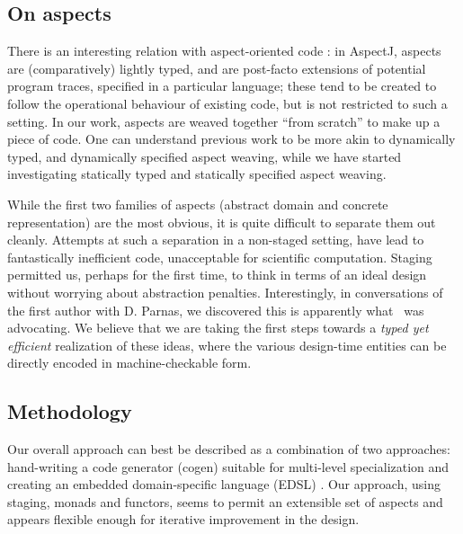 \documentclass{elsart}
\newcommand{\oleg}[1]{{\it [Oleg says: #1]}}
\newcommand{\jacques}[1]{{\it [Jacques says: #1]}}
\begin{document}
\subsection{On aspects}

There is an interesting relation with aspect-oriented code
\cite{kiczales97aspectoriented}: in AspectJ, 
aspects are (comparatively) lightly typed, and are post-facto extensions of
potential program traces, specified in a particular language; these tend
to be created to follow the operational behaviour of existing code, but
is not restricted to such a setting.
In our work, aspects are weaved together ``from scratch'' to
make up a piece of code.  One can understand previous work to be
more akin to dynamically typed, and dynamically specified aspect weaving, while
we have started investigating statically typed and statically specified
aspect weaving.

While the first two families of aspects (abstract domain and concrete
representation) are the most obvious, it is quite difficult to
separate them out cleanly. Attempts at such a separation in a
non-staged setting, have lead to fantastically inefficient code,
unacceptable for scientific computation. Staging permitted us, perhaps
for the first time, to think in terms of an ideal design without
worrying about abstraction penalties.  Interestingly, in conversations
of the first author with D. Parnas, we discovered this is
apparently what~\cite{journals/cacm/parnas72a} was advocating.  We
believe that we are taking the first steps towards a \emph{typed yet
  efficient} realization of these ideas, where the various design-time
entities can be directly encoded in machine-checkable form.

\subsection{Methodology}

Our overall approach can best be described as a combination 
of two approaches: hand-writing a code generator (cogen) suitable
for multi-level specialization \cite{Gluck95,GluckJ97} and creating
an embedded domain-specific language (EDSL) \cite{edsl,WhenHowDSL}.
Our approach, using staging, monads and functors, seems to permit 
an extensible set of aspects and appears flexible enough for iterative
improvement in the design.

%
\end{document}

